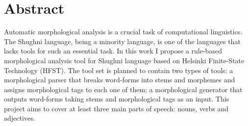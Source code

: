 \section*{Abstract}

Automatic morphological analysis is a crucial task of computational linguistics. The Shughni language, being a minority language, is one of the languages that lacks tools for such an essential task. In this work I propose a rule-based morphological analysis tool for Shughni language based on Helsinki Finite-State Technology (HFST). The tool set is planned to contain two types of tools: a morphological parser that breaks word-forms into stems and morphemes and assigns morphological tags to each one of them; a morphological generator that outputs word-forms taking stems and morphological tags as an input. This project aims to cover at least three main parts of speech: nouns, verbs and adjectives. 

\newpage